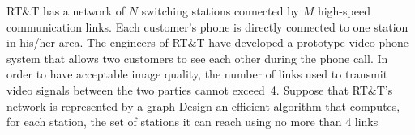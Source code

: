 RT\&T  has a network of $N$ switching stations connected by $M$
high-speed communication links.  Each customer's phone is directly
connected to one station in his/her area.  The engineers of RT\&T  have
developed a prototype video-phone system that allows two customers to
see each other during the phone call.  In order to have acceptable
image quality, the number of links used to transmit video signals
between the two parties cannot exceed~4.  Suppose that RT\&T's  network
is represented by a graph  Design an efficient algorithm that computes,
for each station, the set of stations it can reach using no more than 4
links
